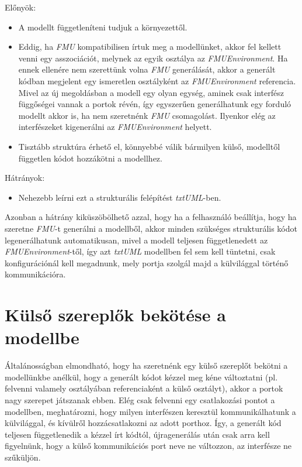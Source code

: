 \documentclass[a4paper,12pt]{report}
\begin{document}
Előnyök: \\
\begin{itemize}
\item A modellt függetleníteni tudjuk a környezettől.
\item  Eddig, ha \textit{FMU} kompatibilisen írtuk meg a modellünket, akkor fel kellett venni egy asszociációt, melynek az egyik osztálya az \textit{FMUEnvironment}. Ha ennek ellenére nem szerettünk volna \textit{FMU} generálását, akkor a generált kódban megjelent egy ismeretlen osztályként az \textit{FMUEnvironment} referencia. Mivel az új megoldásban a modell egy olyan egység, aminek csak interfész függőségei vannak a portok révén, így egyszerűen generálhatunk egy forduló modellt akkor is, ha nem szeretnénk \textit{FMU} csomagolást. Ilyenkor elég az interfészeket kigenerálni az \textit{FMUEnvironment} helyett.
\item Tisztább struktúra érhető el, könnyebbé válik bármilyen külső, modelltől független kódot hozzákötni a modellhez. 
\end{itemize}
Hátrányok: \\
\begin{itemize}
\item Nehezebb leírni ezt a strukturális felépítést \textit{txtUML}-ben.
\end{itemize}
Azonban a hátrány kiküszöbölhető azzal, hogy ha a felhasználó beállítja, hogy ha szeretne \textit{FMU}-t generálni a modellből, akkor minden szükséges strukturális kódot legenerálhatunk automatikusan, mivel a modell teljesen függetlenedett az \textit{FMUEnvironment}-től, így azt \textit{txtUML} modellben fel sem kell tüntetni, csak konfigurációnál kell megadnunk, mely portja szolgál majd a külvilággal történő kommunikációra.

\section{Külső szereplők bekötése a modellbe}
Általánosságban elmondható, hogy ha szeretnénk egy külső szereplőt bekötni a modellünkbe anélkül, hogy a generált kódot kézzel meg kéne változtatni (pl. felvenni valamely osztályában referenciaként a külső osztályt), akkor a portok nagy szerepet játszanak ebben. Elég csak felvenni egy csatlakozási pontot a modellben, meghatározni, hogy milyen interfészen keresztül kommunikálhatunk a külvilággal, és kívülről hozzácsatlakozni az adott porthoz. Így, a generált kód teljesen függetlenedik a kézzel írt kódtól, újragenerálás után csak arra kell figyelnünk, hogy a külső kommunikációs port neve ne változzon, az interfésze ne szűküljön. \\
\end{document}
